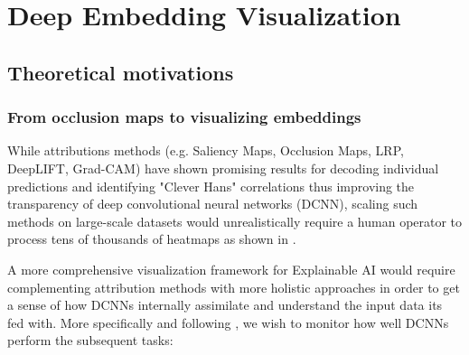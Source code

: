 \newpage

\section{Deep Embedding Visualization}
\label{sec5}

\subsection{Theoretical motivations}

\subsubsection{From occlusion maps to visualizing embeddings}

While attributions methods (e.g. Saliency Maps, Occlusion Maps, LRP, DeepLIFT, Grad-CAM) have shown promising results for decoding individual predictions and identifying "Clever Hans" correlations thus improving the transparency of deep convolutional neural networks (DCNN), scaling such methods on large-scale datasets would unrealistically require a human operator to process tens of thousands of heatmaps as shown in \cite{Lapuschkin_2019}.

A more comprehensive visualization framework for Explainable AI would require complementing attribution methods with more holistic approaches in order to get a sense of how DCNNs internally assimilate and understand the input data its fed with. More specifically and following \cite{Rauber2017VisualizingTH}, we wish to monitor how well DCNNs perform the subsequent tasks:

